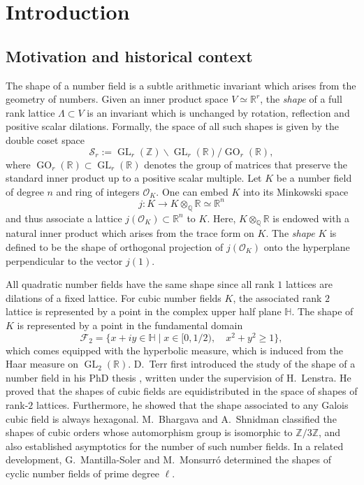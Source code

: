 \documentclass[table]{amsart}
\newcommand{\cF}{\mathcal{F}}
\newcommand{\Q}{\mathbb{Q}}
\newcommand{\cO}{\mathcal{O}}
\newcommand{\op}[1]{\operatorname{#1}}
\numberwithin{equation}{section}
\begin{document}
\section{Introduction}

\subsection{Motivation and historical context}
 The shape of a number field is a subtle arithmetic invariant which arises from the geometry of numbers. Given an inner product space $V\simeq \mathbb{R}^r$, the \emph{shape} of a full rank lattice $\Lambda\subset V$ is an invariant which is unchanged by rotation, reflection and positive scalar dilations. Formally, the space of all such shapes is given by the double coset space
$$
\mathcal{S}_r := \operatorname{GL}_r(\mathbb{Z}) \backslash \operatorname{GL}_r(\mathbb{R}) / \operatorname{GO}_r(\mathbb{R}),
$$
\noindent where $\operatorname{GO}_r(\mathbb{R}) \subset \operatorname{GL}_r(\mathbb{R})$ denotes the group of matrices that preserve the standard inner product up to a positive scalar multiple.
Let $K$ be a number field of degree $n$ and ring of integers $\cO_K$. One can embed $K$ into its Minkowski space 
 \[j: K\rightarrow K\otimes_{\Q} \mathbb{R}\simeq \mathbb{R}^n\] and thus associate a lattice $j(\cO_K)\subset \mathbb{R}^n$ to $K$. Here, $K\otimes_{\Q} \mathbb{R}$ is endowed with a natural inner product which arises from the trace form on $K$. The \emph{shape} $K$ is defined to be the shape of orthogonal projection of $j(\cO_K)$ onto the hyperplane perpendicular to the vector $j(1)$. 
\par All quadratic number fields have the same shape since all rank $1$ lattices are dilations of a fixed lattice. For cubic number fields $K$, the associated rank $2$ lattice is represented by a point in the complex upper half plane $\mathbb{H}$. The shape of $K$ is represented by a point in the fundamental domain \[\cF_2=\{x+iy\in \mathbb{H}\mid x\in [0, 1/2), \quad x^2+y^2\geq 1\},\] which comes equipped with the hyperbolic measure, which is induced from the Haar measure on $\op{GL}_2(\mathbb{R})$. 
D.~Terr first introduced the study of the shape of a number field in his PhD thesis \cite{Terr97}, written under the supervision of H.~Lenstra. He proved that the shapes of cubic fields are equidistributed in the space of shapes of rank-$2$ lattices. Furthermore, he showed that the shape associated to any Galois cubic field is always hexagonal. M.~Bhargava and A.~Shnidman \cite{BS14} classified the shapes of cubic orders whose automorphism group is isomorphic to $\mathbb{Z}/3\mathbb{Z}$, and also established asymptotics for the number of such number fields. In a related development, G.~Mantilla-Soler and M.~Monsurró \cite{MSM16} determined the shapes of cyclic number fields of prime degree $\ell$. 
\end{document}
